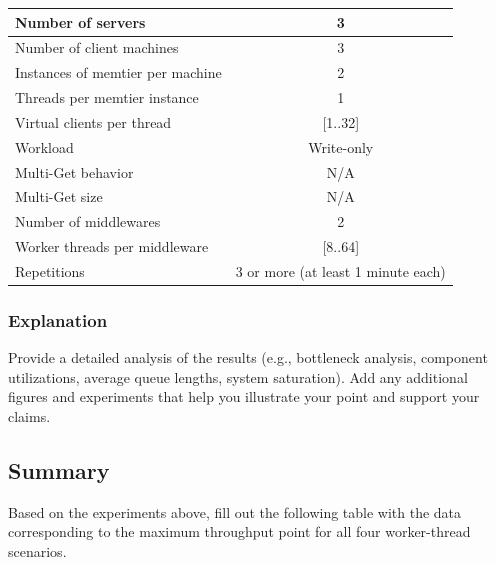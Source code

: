 \documentclass[11pt,a4paper]{article}
\begin{document}
\begin{center}
	\scriptsize{
		\begin{tabular}{|l|c|}
			\hline Number of servers                & 3          \\ 
			\hline Number of client machines        & 3          \\ 
			\hline Instances of memtier per machine & 2          \\ 
			\hline Threads per memtier instance     & 1          \\
			\hline Virtual clients per thread       & [1..32]    \\ 
			\hline Workload                         & Write-only \\
			\hline Multi-Get behavior               & N/A        \\
			\hline Multi-Get size                   & N/A        \\
			\hline Number of middlewares            & 2          \\
			\hline Worker threads per middleware    & [8..64]    \\
			\hline Repetitions                      & 3 or more (at least 1 minute each)  \\ 
			\hline 
		\end{tabular}
	} 
\end{center}

\subsubsection{Explanation}

Provide a detailed analysis of the results (e.g., bottleneck analysis, component utilizations, average queue lengths, system saturation). Add any additional figures and experiments that help you illustrate your point and support your claims.

\subsection{Summary}

Based on the experiments above, fill out the following table with the data corresponding to the maximum throughput point for all four worker-thread scenarios.
\end{document}
